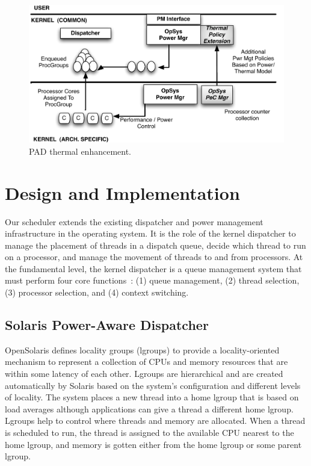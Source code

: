 \documentclass[times,10pt,onecolumn]{article}
\begin{document}
\begin{figure}[htbp]
  \centering
  \includegraphics[scale=0.40]{schedarch.pdf}
  \caption{PAD thermal enhancement.}
  \label{fig:schdarch}
\end{figure}
\section{Design and Implementation}
\label{sec:design}
Our scheduler extends the existing dispatcher and power
management infrastructure in the operating system. It is the role of the
kernel dispatcher to manage the placement of threads in a dispatch
queue, decide which thread to run on a processor, and manage the
movement of threads to and from processors.  At the fundamental level,
the kernel dispatcher is a queue management system that must perform
four core functions~\cite{McDougall2007}: (1) queue management, (2)
thread selection, (3) processor selection, and (4) context switching.
\subsection{Solaris Power-Aware Dispatcher}
\label{sec:solpad}
OpenSolaris defines locality groups (lgroups) to provide a
locality-oriented mechanism to represent a collection of CPUs and
memory resources that are within some latency of each other.
Lgroups are hierarchical and are created automatically by Solaris
based on the system’s conﬁguration and different levels of
locality. The system places a new thread into a home lgroup that
is based on load averages although applications can give a thread
a different home lgroup. Lgroups help to control where threads
and memory are allocated.  When a thread is scheduled to run, the
thread is assigned to the available CPU nearest to the home
lgroup, and memory is gotten either from the home lgroup or some
parent lgroup.
\end{document}

